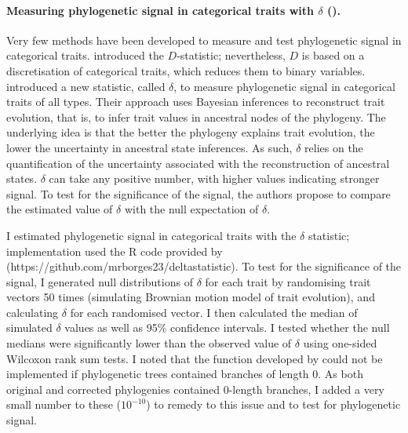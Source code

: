 \paragraph{Measuring phylogenetic signal in categorical traits with $\delta$ (\cite{Borges2018}).}
Very few methods have been developed to measure and test phylogenetic signal in categorical traits. \cite{Fritz2009} introduced the $D$-statistic; nevertheless, $D$ is based on a discretisation of categorical traits, which reduces them to binary variables. \cite{Borges2018} introduced a new statistic, called $\delta$, to measure phylogenetic signal in categorical traits of all types. Their approach uses Bayesian inferences to reconstruct trait evolution, that is, to infer trait values in ancestral nodes of the phylogeny. The underlying idea is that the  better the phylogeny explains trait evolution, the lower the uncertainty in ancestral state inferences. As such, $\delta$ relies on the quantification of the uncertainty associated with the reconstruction of ancestral states. $\delta$ can take any positive number, with higher values indicating stronger signal. To test for the significance of the signal, the authors propose to compare the estimated value of $\delta$ with the null expectation  of $\delta$. 

I estimated phylogenetic signal in categorical traits with the $\delta$ statistic; implementation used the R code provided by \cite{Borges2018} (https://github.com/mrborges23/delta\textunderscore statistic). To test for the significance of the signal, I generated null distributions of $\delta$  for each trait by randomising trait vectors 50 times (simulating Brownian motion model of trait evolution), and calculating $\delta$ for each randomised vector. I then calculated the median of simulated $\delta$ values as well as 95\% confidence intervals. I tested whether the null medians were significantly lower than the observed value of $\delta$ using one-sided Wilcoxon rank sum tests. I noted that the function developed by \cite{Borges2018} could not be implemented if phylogenetic trees contained branches of length 0. As both original and corrected phylogenies contained 0-length branches, I added a very small number to these ($10^{-10}$) to remedy to this issue and to test for phylogenetic signal. 

